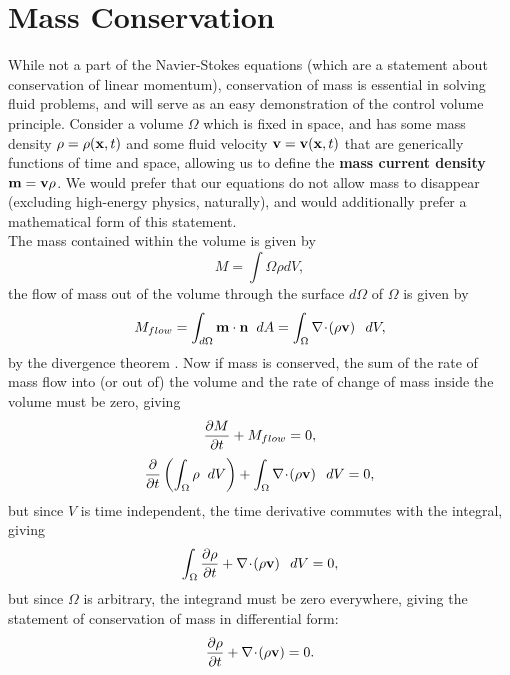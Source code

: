 \section{Mass Conservation}
While not a part of the Navier-Stokes equations (which are a statement about conservation of linear momentum), conservation of mass is essential in solving fluid problems, and will serve as an easy demonstration of the control volume principle. Consider a volume $\Omega$ which is fixed in space, and has some mass density $\rho = \rho(\mathbf{x},t)$ and some fluid velocity $\mathbf{v} = \mathbf{v}(\mathbf{x} ,t)$ that are generically functions of time and space, allowing us to define the {\bf mass current density} $\mathbf{m} = \mathbf{v}\rho$. We would prefer that our equations do not allow mass to disappear (excluding high-energy physics, naturally), and would additionally prefer a mathematical form of this statement. \\

The mass contained within the volume is given by 
\begin{equation}
M = \int{\Omega}{}{\rho}{dV},
\end{equation}
the flow of mass out of the volume through the surface $d\Omega$ of $\Omega$ is given by 
\begin{equation}
M_{flow} = \int{d\Omega}{}{\Vector{m}\cdot\Vector{n}}{dA} = \int{\Omega}{}{\Div{\paren{\rho\Vector{v}}}}{dV},
\end{equation}
by the divergence theorem .  Now if mass is conserved, the sum of the rate of mass flow into (or out of) the volume and the rate of change of mass inside the volume must be zero, giving
\begin{equation}
\pder{1}{M}{t} + M_{flow} = 0,
\end{equation}
\begin{equation}
\pder{1}{}{t}\paren{\int{\Omega}{}{\rho}{dV}} + \int{\Omega}{}{\Div{\paren{\rho\Vector{v}}}}{dV} =0,
\end{equation}
but since $V$ is time independent, the time derivative commutes with the integral, giving 
\begin{equation}
\int{\Omega}{}{\pder{1}{\rho}{t} + \Div{\paren{\rho\Vector{v}}}}{dV} = 0,
\end{equation}
but since $\Omega$ is arbitrary, the integrand must be zero everywhere, giving the statement of conservation of mass in differential form:
\begin{equation}\label{eq:consMassFull}
\pder{1}{\rho}{t} + \Div{\paren{\rho\Vector{v}} }= 0.
\end{equation}


